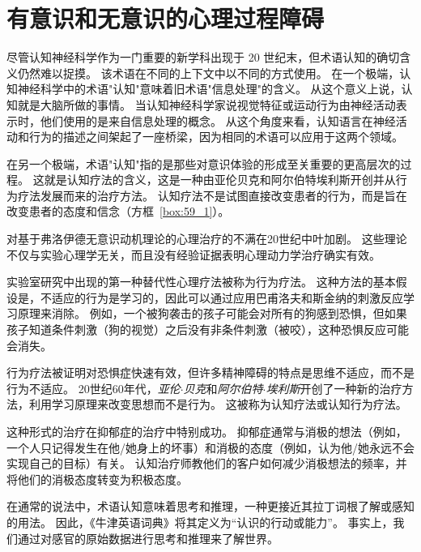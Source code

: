 \chapter{有意识和无意识的心理过程障碍} \label{chap:chap59}

尽管认知神经科学作为一门重要的新学科出现于 20 世纪末，但术语认知的确切含义仍然难以捉摸。
该术语在不同的上下文中以不同的方式使用。
在一个极端，认知神经科学中的术语"认知"意味着旧术语"信息处理"的含义。
从这个意义上说，认知就是大脑所做的事情。
当认知神经科学家说视觉特征或运动行为由神经活动表示时，他们使用的是来自信息处理的概念。
从这个角度来看，认知语言在神经活动和行为的描述之间架起了一座桥梁，因为相同的术语可以应用于这两个领域。


在另一个极端，术语"认知"指的是那些对意识体验的形成至关重要的更高层次的过程。
这就是认知疗法的含义，这是一种由亚伦贝克和阿尔伯特埃利斯开创并从行为疗法发展而来的治疗方法。
认知疗法不是试图直接改变患者的行为，而是旨在改变患者的态度和信念（方框~\ref{box:59_1}）。



\begin{proposition}[认知疗法] \label{box:59_1}
	
	\quad \quad 对基于弗洛伊德无意识动机理论的心理治疗的不满在20世纪中叶加剧。
	这些理论不仅与实验心理学无关，而且没有经验证据表明心理动力学治疗确实有效。
	
	\quad \quad 实验室研究中出现的第一种替代性心理疗法被称为行为疗法。
	这种方法的基本假设是，不适应的行为是学习的，因此可以通过应用巴甫洛夫和斯金纳的刺激反应学习原理来消除。
	例如，一个被狗袭击的孩子可能会对所有的狗感到恐惧，但如果孩子知道条件刺激（狗的视觉）之后没有非条件刺激（被咬），这种恐惧反应可能会消失。
	
	\quad \quad 行为疗法被证明对恐惧症快速有效，但许多精神障碍的特点是思维不适应，而不是行为不适应。
	20世纪60年代，\textit{亚伦$\cdot$贝克}和\textit{阿尔伯特$\cdot$埃利斯}开创了一种新的治疗方法，利用学习原理来改变思想而不是行为。
	这被称为认知疗法或认知行为疗法。
	
	\quad \quad 这种形式的治疗在抑郁症的治疗中特别成功。
	抑郁症通常与消极的想法（例如，一个人只记得发生在他/她身上的坏事）和消极的态度（例如，认为他/她永远不会实现自己的目标）有关。
	认知治疗师教他们的客户如何减少消极想法的频率，并将他们的消极态度转变为积极态度。
	
\end{proposition}



在通常的说法中，术语认知意味着思考和推理，一种更接近其拉丁词根了解或感知的用法。
因此，《牛津英语词典》将其定义为“认识的行动或能力”。
事实上，我们通过对感官的原始数据进行思考和推理来了解世界。


